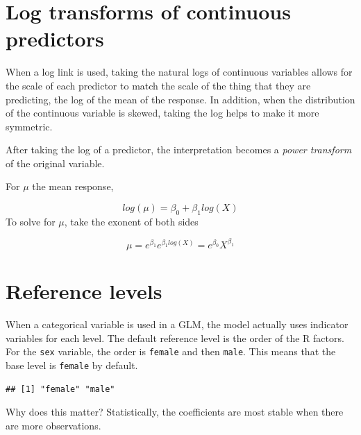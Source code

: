 \documentclass[openany]{book}
\newenvironment{Shaded}{\begin{snugshade}}{\end{snugshade}}
\newcommand{\KeywordTok}[1]{\textcolor[rgb]{0.13,0.29,0.53}{\textbf{#1}}}
\newcommand{\NormalTok}[1]{#1}
\newcommand{\OperatorTok}[1]{\textcolor[rgb]{0.81,0.36,0.00}{\textbf{#1}}}
\newcommand{\StringTok}[1]{\textcolor[rgb]{0.31,0.60,0.02}{#1}}
\begin{document}
\hypertarget{log-transforms-of-continuous-predictors}{%
\section{Log transforms of continuous predictors}\label{log-transforms-of-continuous-predictors}}

When a log link is used, taking the natural logs of continuous variables allows for the scale of each predictor to match the scale of the thing that they are predicting, the log of the mean of the response. In addition, when the distribution of the continuous variable is skewed, taking the log helps to make it more symmetric.

After taking the log of a predictor, the interpretation becomes a \emph{power transform} of the original variable.

For \(\mu\) the mean response,

\[log(\mu) = \beta_0 + \beta_1 log(X)\]
To solve for \(\mu\), take the exonent of both sides

\[\mu = e^{\beta_1} e^{\beta_1 log(X)} = e^{\beta_0} X^{\beta_1}\]

\hypertarget{reference-levels}{%
\section{Reference levels}\label{reference-levels}}

When a categorical variable is used in a GLM, the model actually uses indicator variables for each level. The default reference level is the order of the R factors. For the \texttt{sex} variable, the order is \texttt{female} and then \texttt{male}. This means that the base level is \texttt{female} by default.

\begin{Shaded}
\end{Shaded}

\begin{verbatim}
## [1] "female" "male"
\end{verbatim}

Why does this matter? Statistically, the coefficients are most stable when there are more observations.
\end{document}
